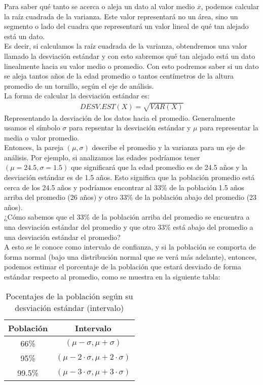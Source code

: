\documentclass{article}
\begin{document}
Para saber qué tanto se acerca o aleja un dato al valor medio $\overline{x}$, podemos calcular la raíz cuadrada de la varianza. Este valor representará no un área, sino un segmento o lado del cuadra que representará un valor lineal de qué tan alejado está un dato. 
\\[12pt]
Es decir, si calculamos la raíz cuadrada de la varianza, obtendremos una valor llamado la desviación estándar y con esto sabremos qué tan alejado está un dato linealmente hacia su valor medio o promedio. Con esto podremos saber si un dato se aleja tantos años de la edad promedio o tantos centímetros de la altura promedio de un tornillo, según el eje de análisis.
\\[12pt]
La forma de calcular la desviación estándar es:
\begin{equation}
    \begin{aligned}
        DESV.EST(X) = \sqrt{VAR(X)}
    \end{aligned}
\end{equation}
Representando la desviación de los datos hacia el promedio. Generalmente usamos el símbolo $\sigma$ para repsentar la desviación estándar y $\mu$ para representar la media o valor promedio.
\\[12pt]
Entonces, la pareja $(\mu, \sigma)$ describe el promedio y la varianza para un eje de análisis. Por ejemplo, si analizamos las edades podríamos tener $(\mu = 24.5, \sigma = 1.5)$ que significará que la edad promedio es de 24.5 años y la desviación estándar es de 1.5 años. Esto significa que la población promedio está cerca de los 24.5 años y podríamos encontrar al 33\% de la población 1.5 años arriba del promedio (26 años) y otro 33\% de la población abajo del promedio (23 años).
\\[12pt]
¿Cómo sabemos que el 33\% de la población arriba del promedio se encuentra a una desviación estándar del promedio y que otro 33\% está abajo del promedio a una desviación estándar el promedio?
\\[12pt]
A esto se le conoce como intervalo de confianza, y si la población se comporta de forma normal (bajo una distribución normal que se verá más adelante), entonces, podemos estimar el porcentaje de la población que estará desviado de forma estándar respecto al promedio, como se muestra en la siguiente tabla:
\begin{table}[h!]
    \centering
    \begin{tabular}{|c|c|}
    \hline
    \textbf{Población} & \textbf{Intervalo} \\ \hline
    66\% & $(\mu - \sigma, \mu + \sigma)$ \\ \hline
    95\% & $(\mu - 2 \cdot \sigma, \mu + 2 \cdot \sigma)$ \\ \hline
    99.5\% & $(\mu - 3 \cdot \sigma, \mu + 3 \cdot \sigma)$ \\ \hline
    \end{tabular}
    \caption{Pocentajes de la población según su desviación estándar (intervalo)}
\end{table}
\end{document}
